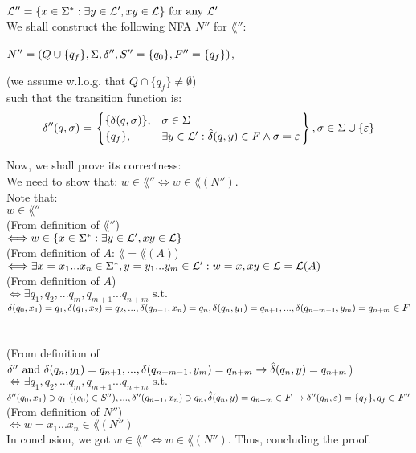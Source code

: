 $\mathcal{L}''=\{x \in \Sigma^* : \exists y \in \mathcal{L}', xy \in \mathcal{L}\} \text{ for any } \mathcal{L}'$
\\

We shall construct the following NFA $N''$ for $\lang''$:

$N''=(Q \cup \{q_f\}, \Sigma, \delta'', S''=\{q_0\}, F''=\{q_f\})$,

(we assume w.l.o.g. that $Q \cap \{q_f\} \neq \emptyset$) \\
such that the transition function is: \\
\[
    \delta''(q,\sigma) = \left.
    \begin{cases}
        \{\delta(q, \sigma)\} , & \sigma \in \Sigma                                                    \\
        \{q_f\},          & \exists y \in \mathcal{L}' : \hat{\delta}(q, y) \in F  \wedge \sigma=\varepsilon \\
    \end{cases}
    \right\} , \sigma \in \Sigma \cup \{\varepsilon\}
\]

Now, we shall prove its correctness: \\
We need to show that: $w \in \lang'' \Longleftrightarrow  w \in \lang(N'')$. \\
Note that: \\
$w \in \lang''$\\

(From definition of $\lang''$) \\
$\Longleftrightarrow w \in \{x \in \Sigma^* : \exists y \in \mathcal{L}', xy \in \mathcal{L}\}$ \\

(From definition of $A$: $\lang = \lang(A)$) \\
$\Longleftrightarrow \exists x=x_1...x_n \in \Sigma^*, y=y_1...y_m \in \mathcal{L}': w=x,  xy \in \mathcal{L} = \mathcal{L}(A)$\\

(From definition of $A$) \\
$\Longleftrightarrow \exists q_1,q_2,...q_m, q_{m+1}...q_{n+m} \text{ s.t. } $\\
$
    \delta(q_0,x_1)=q_1, \delta(q_1,x_2)=q_2, ..., \\
    \delta(q_{n-1},x_n)=q_n, \delta(q_n,y_1)=q_{n+1},...,\\
    \delta(q_{n+m-1},y_{m})=q_{n+m} \in F
$ \\ \\ \\

(From definition of $\delta'' \text{ and }
    \delta(q_n,y_1)=q_{n+1},...,\delta(q_{n+m-1},y_{m})=q_{n+m} \rightarrow \hat{\delta}(q_n, y)=q_{n+m}$) \\
$\Longleftrightarrow \exists q_1,q_2,...q_m, q_{m+1}...q_{n+m} \text{ s.t. } $\\
$
    \delta''(q_0,x_1) \ni q_1  \text{ } ((q_0) \in S''), ..., \\
    \delta''(q_{n-1},x_n) \ni q_n, \\
    \hat{\delta}(q_n, y)=q_{n+m} \in F \rightarrow \delta''(q_n,\varepsilon)=\{q_f\}, q_f \in F''
$ \\

(From definition of $N''$) \\
$\Longleftrightarrow w=x_1...x_n \in \lang(N'')$ \\

In conclusion, we got $w \in \lang'' \Longleftrightarrow  w \in \lang(N'')$. Thus, concluding the proof. \\

